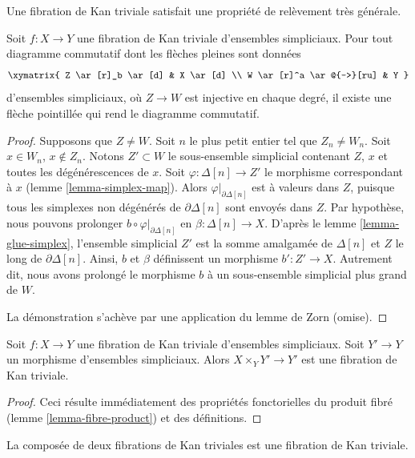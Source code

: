 \noindent
Une fibration de Kan triviale satisfait une propriété de relèvement très générale.

\begin{lemma}
\label{lemma-trivial-kan}
Soit $f : X \to Y$ une fibration de Kan triviale d'ensembles simpliciaux.
Pour tout diagramme commutatif dont les flèches pleines sont données
$$
\xymatrix{
Z \ar[r]_b \ar[d] & X \ar[d] \\
W \ar[r]^a \ar@{-->}[ru] & Y
}
$$
d'ensembles simpliciaux, où $Z \to W$ est injective en chaque degré,
il existe une flèche pointillée qui rend le diagramme commutatif.
\end{lemma}

\begin{proof}
Supposons que $Z \not = W$. Soit $n$ le plus petit entier tel que
$Z_n \not = W_n$. Soit $x \in W_n$, $x \not \in Z_n$. Notons
$Z' \subset W$ le sous-ensemble simplicial contenant $Z$, $x$ et toutes les
dégénérescences de $x$. Soit $\varphi : \Delta[n] \to Z'$ le morphisme
correspondant à $x$ (lemme \ref{lemma-simplex-map}).
Alors $\varphi|_{\partial \Delta[n]}$ est à valeurs dans $Z$, puisque tous
les simplexes non dégénérés de $\partial \Delta[n]$ sont envoyés dans $Z$.
Par hypothèse, nous pouvons prolonger
$b \circ \varphi|_{\partial \Delta[n]}$ en
$\beta : \Delta[n] \to X$.
D'après le lemme \ref{lemma-glue-simplex}, l'ensemble simplicial $Z'$ est la
somme amalgamée de $\Delta[n]$ et $Z$ le long de $\partial \Delta[n]$.
Ainsi, $b$ et $\beta$ définissent un morphisme $b' : Z' \to X$.
Autrement dit, nous avons prolongé le morphisme $b$ à un sous-ensemble
simplicial plus grand de $W$.

\medskip\noindent
La démonstration s'achève par une application du lemme de Zorn (omise).
\end{proof}

\begin{lemma}
\label{lemma-trivial-kan-base-change}
Soit $f : X \to Y$ une fibration de Kan triviale d'ensembles simpliciaux.
Soit $Y' \to Y$ un morphisme d'ensembles simpliciaux.
Alors $X \times_Y Y' \to Y'$ est une fibration de Kan triviale.
\end{lemma}

\begin{proof}
Ceci résulte immédiatement des propriétés fonctorielles du produit fibré
(lemme \ref{lemma-fibre-product}) et des définitions.
\end{proof}

\begin{lemma}
\label{lemma-trivial-kan-composition}
La composée de deux fibrations de Kan triviales est une fibration de Kan triviale.
\end{lemma}

